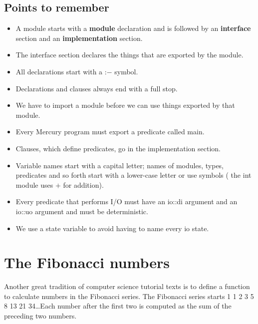 \documentclass[a4paper,11pt,notitlepage,onecolumn]{book}
\begin{document}
\subsection*{Points to remember}

\begin{itemize}
\item A module starts with a \textsf{\textbf{module}} declaration and is followed by an
\textsf{\textbf{interface}} section and an \textsf{\textbf{implementation}} section.
\item The interface section declares the things that are exported by the
module.
\item All declarations start with a \textsf{:{\ensuremath{-}}} symbol.
\item Declarations and clauses always end with a full stop.
\item We have to import a module before we can use things exported by that
module.
\item Every Mercury program must export a predicate called \textsf{main}.
\item Clauses, which define predicates, go in the implementation section.
\item Variable names start with a capital letter; names of modules, types,
predicates and so forth start with a lower-case letter or use symbols (\eg
the \textsf{int} module uses \textsf{{\ensuremath{+}}} for addition).
\item Every predicate that performs I/O must have an \textsf{io::di} argument and an
\textsf{io::uo} argument and must be deterministic.
\item We use a state variable to avoid having to name every \textsf{io} state.
\end{itemize}





\newpage





\section{The Fibonacci numbers}

Another great tradition of computer science tutorial texts is to define a
function to calculate numbers in the Fibonacci series.  The Fibonacci series
starts 1 1 2 3 5 8 13 21 34\ldots  Each number after the first two is
computed as the sum of the preceding two numbers.
\end{document}
